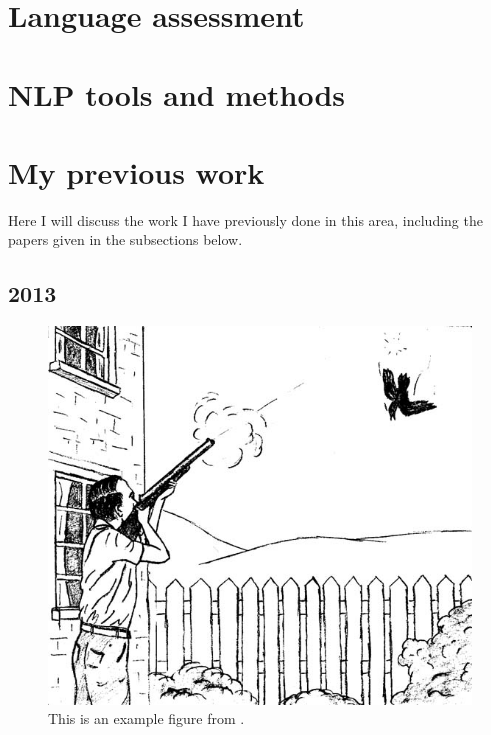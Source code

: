 \cite{Meurers.Dickinson-17}

\cite{heift:schulze:07}

\cite{somasundaran:ea:15}

\cite{bailey:meurers:08}

\cite{meurers2011evaluating}

\cite{somasundaran:chodorow:14}

\cite{cahill-et-al:14}

\cite{ragheb:dickinson:14a}

\cite{foster2009native}

\cite{cho2013investigating}

\cite{landis1977measurement}

\cite{artstein:massimo:2008}

\cite{tetreault-chodorow:2008:HJCL}

\cite{tetreault:chodorow:08}

\section{Language assessment}
\label{section:languageAssessment}

\section{NLP tools and methods}
\label{section:NLP}

\section{My previous work}
\label{section:myPreviousWork}
Here I will discuss the work I have previously done in this area, including the papers given in the subsections below.

\subsection{2013}
\cite{king:dickinson:13}

\begin{figure}
\includegraphics[width=.7\textwidth]{figures/exampleprompt2.jpg}
\caption{This is an example figure from \citet{king:dickinson:13}.}
\label{figure:KandD2013}
\end{figure}

